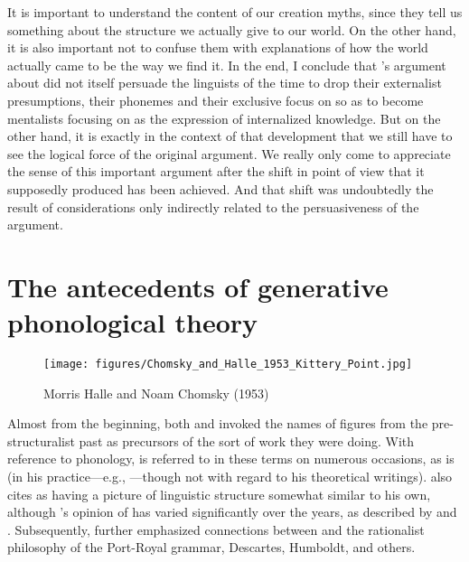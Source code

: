It is important to understand the content of our creation myths, since
they tell us something about the structure we actually give to our
world. On the other hand, it is also important not to confuse them
with explanations of how the world actually came to be the way we find
it. In the end, I conclude that {\Halle}'s argument about  
 did not itself persuade the linguists of the time to drop
their externalist presumptions, their phonemes and their exclusive
focus on  so as to become mentalists focusing on 
as the expression of internalized knowledge. But on the other hand,
it is exactly in the context of that development that we still have to
see the logical force of the original argument.  We really only come
to appreciate the sense of this important argument after the shift in
point of view that it supposedly produced has been achieved. And that
shift was undoubtedly the result of considerations only indirectly
related to the persuasiveness of the argument.
  

\section{The antecedents of generative phonological theory}

\begin{wrapfigure}{r}{.45\textwidth}
  \texttt{[image: figures/Chomsky\_and\_Halle\_1953\_Kittery\_Point.jpg]}
  \caption{Morris Halle and Noam Chomsky (1953)}
  \label{fig:ch.genphon.kittery}
\end{wrapfigure}
Almost from the beginning, both {\Chomsky} and {\Halle} invoked the names of
figures from the pre-structuralist past as precursors of the sort of
work they were doing. With reference to phonology, {\Sapir} is referred
to in these terms on numerous occasions, as is {\Bloomfield} (in his
practice—e.g., \citealt{bloomfield:menomini_morphophonemics}—though
not with regard to his theoretical
writings). \citet{chomsky63:formalprops} also cites {\Saussure} as
having a picture of linguistic structure somewhat similar to his own,
although {\Chomsky}'s opinion of {\Saussure} has varied significantly over
the years, as described by
\citet[143--155]{joseph02:whitney.to-chomsky} and
\citet{newmeyer13:saussure}. Subsequently, \citet{chomsky66:cartesian}
further emphasized connections between  and the
rationalist philosophy of the Port-Royal grammar, 
Descartes, Humboldt, and others.

